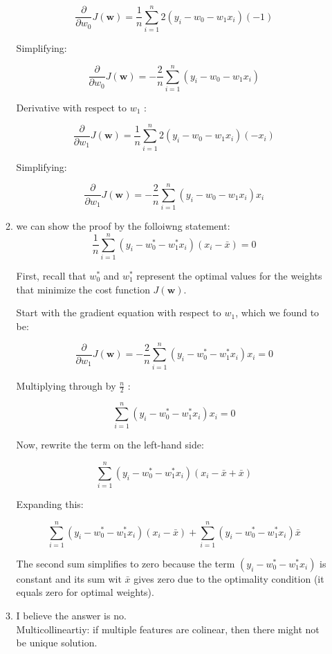\documentclass[12pt]{article}
\begin{document}
\begin{enumerate}
\begin{enumerate}
$$
\frac{\partial}{\partial w_0} J(\mathbf{w})=\frac{1}{n} \sum_{i=1}^n 2\left(y_i-w_0-w_1 x_i\right)(-1)
$$


Simplifying:

$$
\frac{\partial}{\partial w_0} J(\mathbf{w})=-\frac{2}{n} \sum_{i=1}^n\left(y_i-w_0-w_1 x_i\right)
$$


Derivative with respect to $w_1$ :

$$
\frac{\partial}{\partial w_1} J(\mathbf{w})=\frac{1}{n} \sum_{i=1}^n 2\left(y_i-w_0-w_1 x_i\right)\left(-x_i\right)
$$


Simplifying:

$$
\frac{\partial}{\partial w_1} J(\mathbf{w})=-\frac{2}{n} \sum_{i=1}^n\left(y_i-w_0-w_1 x_i\right) x_i
$$

  \item we can show the proof by the folloiwng statement:\\
  
$$
\frac{1}{n} \sum_{i=1}^n\left(y_i-w_0^*-w_1^* x_i\right)\left(x_i-\bar{x}\right)=0
$$


First, recall that $w_0^*$ and $w_1^*$ represent the optimal values for the weights that minimize the cost function $J(\mathbf{w})$.

Start with the gradient equation with respect to $w_1$, which we found to be:

$$
\frac{\partial}{\partial w_1} J(\mathbf{w})=-\frac{2}{n} \sum_{i=1}^n\left(y_i-w_0^*-w_1^* x_i\right) x_i=0
$$


Multiplying through by $\frac{n}{2}$ :

$$
\sum_{i=1}^n\left(y_i-w_0^*-w_1^* x_i\right) x_i=0
$$


Now, rewrite the term on the left-hand side:

$$
\sum_{i=1}^n\left(y_i-w_0^*-w_1^* x_i\right)\left(x_i-\bar{x}+\bar{x}\right)
$$


Expanding this:

$$
\sum_{i=1}^n\left(y_i-w_0^*-w_1^* x_i\right)\left(x_i-\bar{x}\right)+\sum_{i=1}^n\left(y_i-w_0^*-w_1^* x_i\right) \bar{x}
$$


The second sum simplifies to zero because the term $\left(y_i-w_0^*-w_1^* x_i\right)$ is constant and its sum wit $\bar{x}$ gives zero due to the optimality condition (it equals zero for optimal weights).
    \item I believe the answer is no.\\
    Multicollineartiy: if multiple features are colinear, then there might not be unique solution.
    

\end{enumerate}
\end{enumerate}
\end{document}
